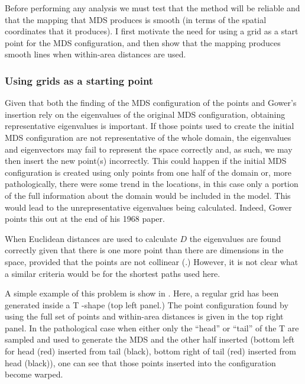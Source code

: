 Before performing any analysis we must test that the method will be reliable and that the mapping that MDS produces is smooth (in terms of the spatial coordinates that it produces). I first motivate the need for using a grid as a start point for the MDS configuration, and then show that the mapping produces smooth lines when within-area distances are used.

\subsubsection{Using grids as a starting point}
\label{grids}
Given that both the finding of the MDS configuration of the points and Gower's insertion rely on the eigenvalues of the original MDS configuration, obtaining representative eigenvalues is important. If those points used to create the initial MDS configuration are not representative of the whole domain, the eigenvalues and eigenvectors may fail to represent the space correctly and, as such, we may then insert the new point(s) incorrectly. This could happen if the initial MDS configuration is created using only points from one half of the domain or, more pathologically, there were some trend in the locations, in this case only a portion of the full information about the domain would be included in the model. This would lead to the unrepresentative eigenvalues being calculated. Indeed, Gower points this out at the end of his 1968 paper.

When Euclidean distances are used to calculate $D$ the eigenvalues are found correctly given that there is one more point than there are dimensions in the space, provided that the points are not collinear (\cite{landmark}.) However, it is not clear what a similar criteria would be for the shortest paths used here. 

A simple example of this problem is show in . Here, a regular grid has been generated inside a T -shape (top left panel.) The point configuration found by using the full set of points and within-area distances is given in the top right panel. In the pathological case when either only the ``head'' or ``tail'' of the T are sampled and used to generate the MDS and the other half inserted (bottom left for head (red) inserted from tail (black), bottom right of tail (red) inserted from head (black)), one can see that those points inserted into the configuration become warped. 

